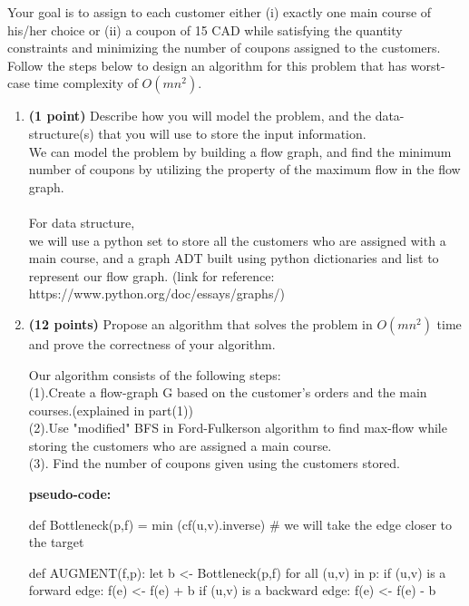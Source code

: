 \documentclass{assignment-373}
\begin{document}
Your goal is to assign to each customer either (i) exactly one main course of his/her choice or (ii) a coupon of 15 CAD while satisfying the quantity constraints and minimizing the number of coupons assigned to the customers. Follow the steps below to design an algorithm for this problem that has worst-case time complexity of $O(mn^2)$. 
\begin{enumerate}
    \item \textbf{(1 point)} Describe how you will model the problem, and the data-structure(s) that you will use to store the input information. \\
    
    \phantom{=} \phantom{=} We can model the problem by building a flow graph, and find the minimum number of coupons by utilizing the property of the maximum flow in the flow graph.\\
    \\
    
    \phantom{=} \phantom{=} For data structure, \\
    \phantom{=} \phantom{=} \phantom{=} \phantom{=} we will use a python set to store all the customers who are assigned with a main course, and a graph ADT built using python dictionaries and list to represent our flow graph. (link for reference: https://www.python.org/doc/essays/graphs/)
    
    \item \label{part:algo} \textbf{(12 points)} Propose an algorithm that solves the problem in $O(mn^2)$ time and prove the correctness of your algorithm.
    
    Our algorithm consists of the following steps:\\
    \phantom{=} \phantom{=} (1).Create a flow-graph G based on the customer's orders and the main courses.(explained in part(1))\\
    \phantom{=} \phantom{=} (2).Use "modified" BFS in Ford-Fulkerson algorithm to find max-flow while storing the customers who are assigned a main course.\\
    \phantom{=} \phantom{=} (3). Find the number of coupons given using the customers stored.
    
    \textbf{pseudo-code:}
    \begin{python}
    def Bottleneck(p,f) = min (cf(u,v).inverse) 
    # we will take the edge closer to the target

    def AUGMENT(f,p):
        let b <- Bottleneck(p,f)
        for all (u,v) in p:
            if (u,v) is a forward edge:
                f(e) <- f(e) + b
            if (u,v) is a backward edge:
                f(e) <- f(e) - b
    

\end{python}
\end{enumerate}
\end{document}
